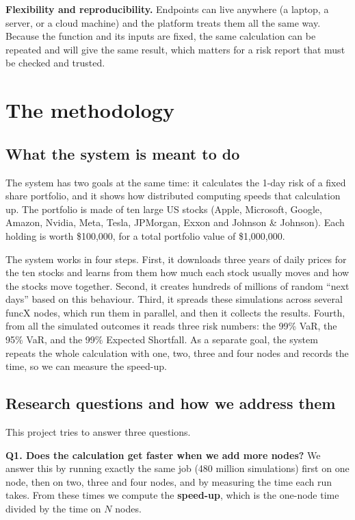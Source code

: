 \documentclass[11pt,a4paper]{article}
\begin{document}
\textbf{Flexibility and reproducibility.} Endpoints can live anywhere (a laptop, a server, or a cloud machine) and the platform treats them all the same way. Because the function and its inputs are fixed, the same calculation can be repeated and will give the same result, which matters for a risk report that must be checked and trusted.

\section{The methodology}

\subsection{What the system is meant to do}

The system has two goals at the same time: it calculates the 1-day risk of a fixed share portfolio, and it shows how distributed computing speeds that calculation up. The portfolio is made of ten large US stocks (Apple, Microsoft, Google, Amazon, Nvidia, Meta, Tesla, JPMorgan, Exxon and Johnson \& Johnson). Each holding is worth \$100,000, for a total portfolio value of \$1,000,000.

The system works in four steps. First, it downloads three years of daily prices for the ten stocks and learns from them how much each stock usually moves and how the stocks move together. Second, it creates hundreds of millions of random ``next days'' based on this behaviour. Third, it spreads these simulations across several funcX nodes, which run them in parallel, and then it collects the results. Fourth, from all the simulated outcomes it reads three risk numbers: the 99\% VaR, the 95\% VaR, and the 99\% Expected Shortfall. As a separate goal, the system repeats the whole calculation with one, two, three and four nodes and records the time, so we can measure the speed-up.

\subsection{Research questions and how we address them}

This project tries to answer three questions.

\textbf{Q1. Does the calculation get faster when we add more nodes?} We answer this by running exactly the same job (480 million simulations) first on one node, then on two, three and four nodes, and by measuring the time each run takes. From these times we compute the \textbf{speed-up}, which is the one-node time divided by the time on $N$ nodes.
\end{document}
